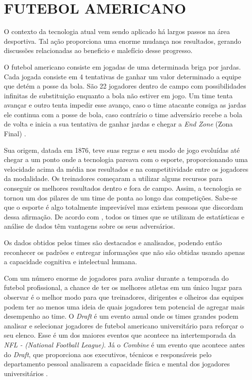 \section{{FUTEBOL AMERICANO}}

O contexto da tecnologia atual vem sendo aplicado há largos passos na área desportiva. Tal ação proporciona uma enorme mudança nos resultados, gerando discussões relacionadas ao beneficio e malefício desse progresso.

O futebol americano consiste em jogadas de uma determinada briga por jardas. Cada jogada consiste em 4 tentativas de ganhar um valor determinado a equipe que detém a posse da bola. São 22 jogadores dentro de campo com possibilidades infinitas de substituição enquanto a bola não estiver em jogo. Um time tenta avançar e outro tenta impedir esse avanço, caso o time atacante consiga as jardas ele continua com a posse de bola, caso contrário o time adversário recebe a bola de volta e inicia a sua tentativa de ganhar jardas e chegar a \textit{End Zone} (Zona Final) \cite{NFL2019}.

Sua origem, datada em 1876, teve suas regras e seu modo de jogo evoluídas até chegar a um ponto onde a tecnologia pareava com o esporte, proporcionando uma velocidade acima da média nos resultados e na competitividade entre os jogadores da modalidade. Os treinadores começaram a utilizar alguns recursos para conseguir os melhores resultados dentro e fora de campo. Assim, a tecnologia se tornou um dos pilares de um time de ponta ao longo das competições. Sabe-se que o esporte é algo totalmente imprevisível mas existem pessoas que discordam dessa afirmação. De acordo com , todos os times que se utilizam de estatísticas e análise de dados têm vantagens sobre os seus adversários.

Os dados obtidos pelos times são destacados e analisados, podendo então reconhecer os padrões e entregar informações que não são obtidas usando apenas a capacidade cognitiva e intelectual humana.

Com um número enorme de jogadores para avaliar durante a temporada do futebol profissional, a chance de ter os melhores atletas em um único lugar para observar é o melhor modo para que treinadores, dirigentes e olheiros das equipes podem ter ao menos uma ideia de quais jogadores tem potencial de agregar mais desempenho ao time. O \textit{Draft} é um evento anual onde os times grandes podem analisar e selecionar jogadores de futebol americano universitário para reforçar o seu elenco. Esse é um dos maiores eventos que acontece na intertemporada da \textit{NFL - (National Football League)}. Já o \textit{Combine} é um evento que acontece antes do \textit{Draft}, que proporciona aos executivos, técnicos e responsáveis pelo departamento pessoal analisarem a capacidade física e mental dos jogadores universitários \cite{MCGEE2003}.

